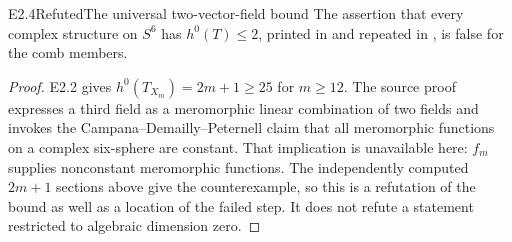 \begin{claim}{E2.4}{Refuted}{The universal two-vector-field bound}
The assertion that every complex structure on $S^6$ has
$h^0(T)\le2$, printed in
\citet[Corollary 1.3; verified preprint p.~2]{HKP2000}
and repeated in \citet[Remarks 1.2 and 9.26]{AC2026}, is false
for the comb members.
\end{claim}
\begin{proof}
E2.2 gives $h^0(T_{X_m})=2m+1\ge25$ for $m\ge12$.
The source proof expresses a third field as a meromorphic linear
combination of two fields and invokes the Campana--Demailly--Peternell
claim that all meromorphic functions on a complex six-sphere are
constant. That implication is unavailable here: $f_m$ supplies
nonconstant meromorphic functions. The independently computed
$2m+1$ sections above give the counterexample, so this is a
refutation of the bound as well as a location of the failed step.
It does not refute a statement restricted to algebraic dimension
zero.
\end{proof}
